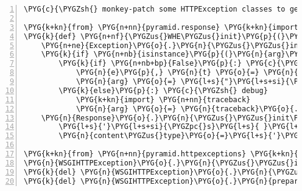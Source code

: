 \begin{Verbatim}[commandchars=\\\{\},numbers=left,firstnumber=1,stepnumber=5]
\PYG{c}{\PYGZsh{} monkey-patch some HTTPException classes to get simpler error messages}

\PYG{k+kn}{from} \PYG{n+nn}{pyramid.response} \PYG{k+kn}{import} \PYG{n}{Response}
\PYG{k}{def} \PYG{n+nf}{\PYGZus{}WHE\PYGZus{}init}\PYG{p}{(}\PYG{n+nb+bp}{self}\PYG{p}{,} \PYG{n}{arg}\PYG{o}{=}\PYG{n+nb+bp}{None}\PYG{p}{)}\PYG{p}{:}
    \PYG{n+ne}{Exception}\PYG{o}{.}\PYG{n}{\PYGZus{}\PYGZus{}init\PYGZus{}\PYGZus{}}\PYG{p}{(}\PYG{n+nb+bp}{self}\PYG{p}{,} \PYG{n}{arg}\PYG{p}{)}
    \PYG{k}{if} \PYG{n+nb}{isinstance}\PYG{p}{(}\PYG{n}{arg}\PYG{p}{,} \PYG{n+ne}{Exception}\PYG{p}{)}\PYG{p}{:}
        \PYG{k}{if} \PYG{n+nb+bp}{False}\PYG{p}{:} \PYG{c}{\PYGZsh{} production}
            \PYG{n}{e}\PYG{p}{,} \PYG{n}{t} \PYG{o}{=} \PYG{n}{arg}\PYG{p}{,} \PYG{n+nb}{type}\PYG{p}{(}\PYG{n}{arg}\PYG{p}{)}
            \PYG{n}{arg} \PYG{o}{=} \PYG{l+s}{"}\PYG{l+s+si}{\PYGZpc{}s}\PYG{l+s}{ }\PYG{l+s+si}{\PYGZpc{}s}\PYG{l+s}{"} \PYG{o}{\PYGZpc{}} \PYG{p}{(}\PYG{n}{t}\PYG{o}{.}\PYG{n}{\PYGZus{}\PYGZus{}name\PYGZus{}\PYGZus{}}\PYG{p}{,} \PYG{n}{e}\PYG{o}{.}\PYG{n}{args}\PYG{p}{)}
        \PYG{k}{else}\PYG{p}{:} \PYG{c}{\PYGZsh{} debug}
            \PYG{k+kn}{import} \PYG{n+nn}{traceback}
            \PYG{n}{arg} \PYG{o}{=} \PYG{n}{traceback}\PYG{o}{.}\PYG{n}{format\PYGZus{}exc}\PYG{p}{(}\PYG{l+m+mi}{999}\PYG{p}{)}
    \PYG{n}{Response}\PYG{o}{.}\PYG{n}{\PYGZus{}\PYGZus{}init\PYGZus{}\PYGZus{}}\PYG{p}{(}\PYG{n+nb+bp}{self}\PYG{p}{,}
        \PYG{l+s}{'}\PYG{l+s+si}{\PYGZpc{}s}\PYG{l+s}{ }\PYG{l+s+si}{\PYGZpc{}s}\PYG{l+s+se}{\PYGZbs{}n}\PYG{l+s+se}{\PYGZbs{}n}\PYG{l+s+si}{\PYGZpc{}s}\PYG{l+s}{'} \PYG{o}{\PYGZpc{}} \PYG{p}{(}\PYG{n+nb+bp}{self}\PYG{o}{.}\PYG{n}{code}\PYG{p}{,} \PYG{n+nb+bp}{self}\PYG{o}{.}\PYG{n}{title}\PYG{p}{,} \PYG{n}{arg}\PYG{p}{)}\PYG{p}{,}
        \PYG{n}{content\PYGZus{}type}\PYG{o}{=}\PYG{l+s}{'}\PYG{l+s}{text/plain}\PYG{l+s}{'}\PYG{p}{,} \PYG{n}{status}\PYG{o}{=}\PYG{l+s}{'}\PYG{l+s+si}{\PYGZpc{}s}\PYG{l+s}{ }\PYG{l+s+si}{\PYGZpc{}s}\PYG{l+s}{'} \PYG{o}{\PYGZpc{}} \PYG{p}{(}\PYG{n+nb+bp}{self}\PYG{o}{.}\PYG{n}{code}\PYG{p}{,} \PYG{n+nb+bp}{self}\PYG{o}{.}\PYG{n}{title}\PYG{p}{)}\PYG{p}{)}

\PYG{k+kn}{from} \PYG{n+nn}{pyramid.httpexceptions} \PYG{k+kn}{import} \PYG{n}{WSGIHTTPException}
\PYG{n}{WSGIHTTPException}\PYG{o}{.}\PYG{n}{\PYGZus{}\PYGZus{}init\PYGZus{}\PYGZus{}} \PYG{o}{=} \PYG{n}{\PYGZus{}WHE\PYGZus{}init}
\PYG{k}{del} \PYG{n}{WSGIHTTPException}\PYG{o}{.}\PYG{n}{\PYGZus{}\PYGZus{}call\PYGZus{}\PYGZus{}}
\PYG{k}{del} \PYG{n}{WSGIHTTPException}\PYG{o}{.}\PYG{n}{prepare}
\end{Verbatim}



